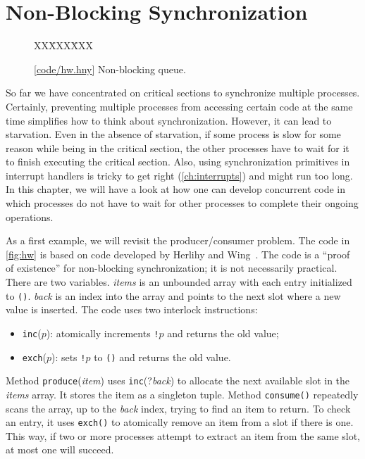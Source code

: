 \documentclass{report}
\newcommand{\harmonysource}[1]{
\begin{tabbing}
XX\=XXX\=XXX\kill
    
\end{tabbing}
}
\newcommand{\harmonylink}[1]{%
[\href{https://www.cs.cornell.edu/home/rvr/harmony/#1}{\underline{#1}}]%
}
\newenvironment{code}{
\tcolorbox
}{
\endtcolorbox
}
\begin{document}
\chapter{Non-Blocking Synchronization}
\label{ch:nonblocking}
%

%

\begin{figure}
\begin{code}
\harmonysource{hw}
\end{code}
\caption{\harmonylink{code/hw.hny} Non-blocking queue.}
\label{fig:hw}
\end{figure}

So far we have concentrated on critical sections to synchronize multiple
processes.  Certainly, preventing multiple processes from accessing
certain code at the same time simplifies how to think about synchronization.
However, it can lead to starvation.  Even in the absence of starvation,
if some process is slow for some reason while being in the critical section,
the other processes have to wait for it to finish executing the critical section.
Also, using synchronization primitives in interrupt handlers is tricky
to get right (\autoref{ch:interrupts}) and might run too long.
In this chapter, we will have a look at how one can develop concurrent
code in which processes do not have to wait for other processes to complete their
ongoing operations.

As a first example, we will revisit the producer/consumer problem.
The code in \autoref{fig:hw} is based on code developed by Herlihy and
Wing~\cite{HW87}.
The code is a ``proof of existence'' for non-blocking synchronization; it
is not necessarily practical.
There are two variables.  \textit{items} is an unbounded array with each
entry initialized to \texttt{()}.  \textit{back} is an index into the
array and points to the next slot where a new value is inserted.
The code uses two interlock instructions:
\begin{itemize}
\item \texttt{inc}($p$): atomically increments \texttt{!}$p$ and returns
the old value;
\item \texttt{exch}($p$): sets \texttt{!}$p$ to \texttt{()} and returns
the old value.
\end{itemize}

Method \texttt{produce}(\textit{item}) uses \texttt{inc}(?\textit{back})
to allocate
the next available slot in the \textit{items} array.
It stores the item as a singleton tuple.
Method \texttt{consume()} repeatedly scans the array, up to the
\textit{back} index, trying to find an item to return.
To check an entry, it uses \texttt{exch()}
to atomically remove an item from a slot if there is one.
This way, if two or more processes attempt to extract an item from
the same slot, at most one will succeed.
\end{document}
